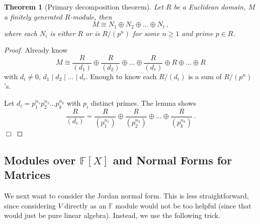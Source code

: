 \documentclass{article}
\theoremstyle{plain}\theoremheaderfont{\normalfont\itshape}\theorembodyfont{\rmfamily}\theoremseparator{.}\newtheorem*{rem}{Remark}\newtheorem*{ex}{Example}\newtheorem*{proof}{Proof}\newtheorem*{altp}{Alternative proof}\newtheorem*{nonex}{Non-Example}
\theoremstyle{plain}\theoremheaderfont{\normalfont\bfseries}\theorembodyfont{\rmfamily}\theoremseparator{.}\newtheorem{thm}{Theorem}[section]\newtheorem{lem}[thm]{Lemma}\newtheorem{prop}[thm]{Proposition}\newtheorem*{cor}{Corollary}\newtheorem{defn}[thm]{Definition}\newtheorem{clm}[thm]{Claim}\newtheorem{clminproof}{Claim}\newtheorem*{notn}{Notation}\newtheorem*{exer}{Exercise}\newtheorem*{lemnn}{Lemma}
\theoremstyle{break}\theoremheaderfont{\normalfont\itshape}\theorembodyfont{\rmfamily}\theoremseparator{.\medskip}\newtheorem*{proofskip}{Proof}\newtheorem*{exs}{Examples}\newtheorem*{rems}{Remarks}\newtheorem*{obs}{Observations}
\theoremstyle{break}\theoremheaderfont{\normalfont\bfseries}\theorembodyfont{\rmfamily}\theoremseparator{.\medskip}\newtheorem{lemskip}[thm]{Lemma}\newtheorem{defnskip}[thm]{Definition}\newtheorem{propskip}[thm]{Proposition}\newtheorem{thmskip}[thm]{Theorem}
\numberwithin{equation}{section}
\newcommand{\qed}{\hfill\ensuremath{\Box}}
\newcommand{\FF}{\mathbb{F}}
\begin{document}
    \begin{thm}[Primary decomposition theorem]
        Let \(R\) be a Euclidean domain, \(M\) a finitely generated \(R\)-module, then
        \[M\cong N_1\oplus N_2\oplus\dots\oplus N_t\,,\]
        where each \(N_i\) is either \(R\) or is \(R/(p^n)\) for some \(n\ge 1\) and prime \(p\in R\).
    \end{thm}
    \begin{proof}
        Already know
        \[M\cong\frac{R}{(d_1)}\oplus\frac{R}{(d_2)}\oplus\dots\oplus\frac{R}{(d_r)}\oplus R\oplus\dots\oplus R\]
        with \(d_i\ne 0\), \(d_1\mid d_2\mid \dots\mid d_r\). Enough to know each \(R/(d_i)\) is a sum of \(R/(p^n)\)'s.

        Let \(d_i=p_1^{n_1}p_2^{n_2}\dots p_k^{n_k}\) with \(p_i\) distinct primes. The lemma shows
        \[\frac{R}{(d_i)}=\frac{R}{(p_1^{n_1})}\oplus\frac{R}{(p_2^{n_2})}\oplus\dots\oplus\frac{R}{(p_k^{n_k})}\,.\]\qed
    \end{proof}
    \subsection{Modules over \texorpdfstring{\(\FF[X]\)}{F[X]} and Normal Forms for Matrices}
    We next want to consider the Jordan normal form. This is less straightforward, since considering \(V\) directly as an \(\FF\) module would not be too helpful (since that would just be pure linear algebra). Instead, we use the following trick.
\end{document}

